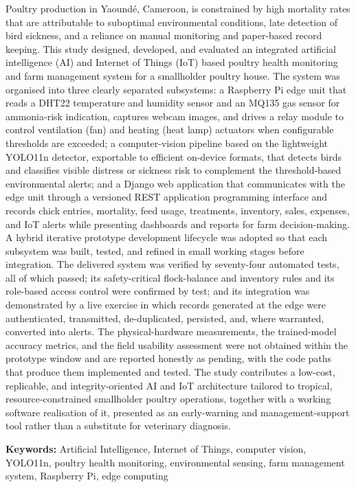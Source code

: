 \documentclass[12pt,a4paper]{report}
\begin{document}
Poultry production in Yaound\'e, Cameroon, is constrained by high mortality rates that are attributable to suboptimal environmental conditions, late detection of bird sickness, and a reliance on manual monitoring and paper-based record keeping. This study designed, developed, and evaluated an integrated artificial intelligence (AI) and Internet of Things (IoT) based poultry health monitoring and farm management system for a smallholder poultry house. The system was organised into three clearly separated subsystems: a Raspberry Pi edge unit that reads a DHT22 temperature and humidity sensor and an MQ135 gas sensor for ammonia-risk indication, captures webcam images, and drives a relay module to control ventilation (fan) and heating (heat lamp) actuators when configurable thresholds are exceeded; a computer-vision pipeline based on the lightweight YOLO11n detector, exportable to efficient on-device formats, that detects birds and classifies visible distress or sickness risk to complement the threshold-based environmental alerts; and a Django web application that communicates with the edge unit through a versioned REST application programming interface and records chick entries, mortality, feed usage, treatments, inventory, sales, expenses, and IoT alerts while presenting dashboards and reports for farm decision-making. A hybrid iterative prototype development lifecycle was adopted so that each subsystem was built, tested, and refined in small working stages before integration. The delivered system was verified by seventy-four automated tests, all of which passed; its safety-critical flock-balance and inventory rules and its role-based access control were confirmed by test; and its integration was demonstrated by a live exercise in which records generated at the edge were authenticated, transmitted, de-duplicated, persisted, and, where warranted, converted into alerts. The physical-hardware measurements, the trained-model accuracy metrics, and the field usability assessment were not obtained within the prototype window and are reported honestly as pending, with the code paths that produce them implemented and tested. The study contributes a low-cost, replicable, and integrity-oriented AI and IoT architecture tailored to tropical, resource-constrained smallholder poultry operations, together with a working software realisation of it, presented as an early-warning and management-support tool rather than a substitute for veterinary diagnosis.

\vspace{0.8cm}
\noindent\textbf{Keywords:} Artificial Intelligence, Internet of Things, computer vision, YOLO11n, poultry health monitoring, environmental sensing, farm management system, Raspberry Pi, edge computing
\end{document}
